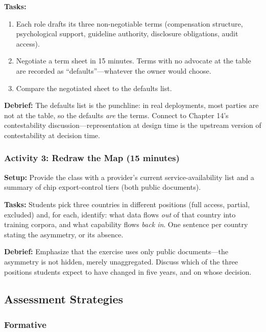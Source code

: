 \textbf{Tasks:}
\begin{enumerate}
    \item Each role drafts its three non-negotiable terms (compensation structure, psychological support, guideline authority, disclosure obligations, audit access).
    \item Negotiate a term sheet in 15 minutes. Terms with no advocate at the table are recorded as ``defaults''---whatever the owner would choose.
    \item Compare the negotiated sheet to the defaults list.
\end{enumerate}

\textbf{Debrief:} The defaults list is the punchline: in real deployments, most parties are not at the table, so the defaults \emph{are} the terms. Connect to Chapter 14's contestability discussion---representation at design time is the upstream version of contestability at decision time.

\subsubsection*{Activity 3: Redraw the Map (15 minutes)}

\textbf{Setup:} Provide the class with a provider's current service-availability list and a summary of chip export-control tiers (both public documents).

\textbf{Tasks:} Students pick three countries in different positions (full access, partial, excluded) and, for each, identify: what data flows \emph{out} of that country into training corpora, and what capability flows \emph{back in}. One sentence per country stating the asymmetry, or its absence.

\textbf{Debrief:} Emphasize that the exercise uses only public documents---the asymmetry is not hidden, merely unaggregated. Discuss which of the three positions students expect to have changed in five years, and on whose decision.

\subsection*{Assessment Strategies}

\subsubsection*{Formative}

